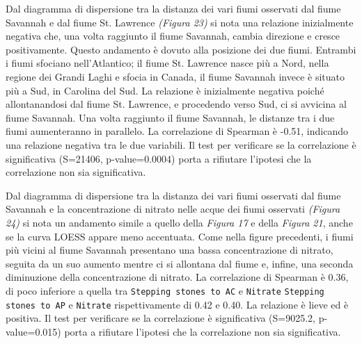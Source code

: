 \documentclass{article} %
\begin{document}
Dal diagramma di dispersione tra la distanza dei vari fiumi osservati dal fiume Savannah e dal fiume St. Lawrence \textit{(Figura 23)} si nota una relazione inizialmente negativa che, una volta raggiunto il fiume Savannah, cambia direzione e cresce positivamente. 
Questo andamento è dovuto alla posizione dei due fiumi. Entrambi i fiumi sfociano nell'Atlantico; il fiume St. Lawrence nasce più a Nord, nella regione dei Grandi Laghi e sfocia in Canada, il fiume Savannah invece è situato più a Sud, in Carolina del Sud. La relazione è inizialmente negativa poiché allontanandosi dal fiume St. Lawrence, e procedendo verso Sud, ci si avvicina al fiume Savannah. Una volta raggiunto il fiume Savannah, le distanze tra i due fiumi aumenteranno in parallelo.
La correlazione di Spearman è -0.51, indicando una relazione negativa tra le due variabili.  
Il test per verificare se la correlazione è significativa (S=21406, p-value=0.0004) porta a rifiutare l'ipotesi che la correlazione non sia significativa.

Dal diagramma di dispersione tra la distanza dei vari fiumi osservati dal fiume Savannah e la concentrazione di nitrato nelle acque dei fiumi osservati \textit{(Figura 24)} si nota un andamento simile a quello della \textit{Figura 17} e della \textit{Figura 21}, anche se la curva LOESS appare meno accentuata. 
Come nella figure precedenti, i fiumi più vicini al fiume Savannah presentano una bassa concentrazione di nitrato, seguita da un suo aumento mentre ci si allontana dal fiume e, infine, una seconda diminuzione della concentrazione di nitrato.
La correlazione di Spearman è 0.36, di poco inferiore a quella tra \texttt{Stepping stones to AC} e \texttt{Nitrate} \texttt{Stepping stones to AP} e \texttt{Nitrate} rispettivamente di 0.42 e 0.40. La relazione è lieve ed è positiva. 
Il test per verificare se la correlazione è significativa (S=9025.2, p-value=0.015) porta a rifiutare l'ipotesi che la correlazione non sia significativa.
\end{document}

